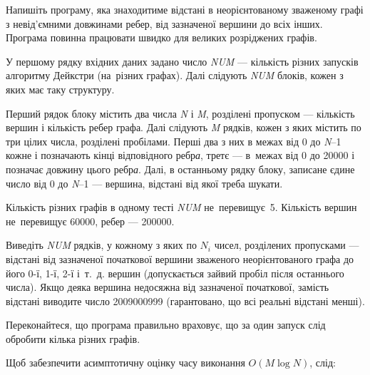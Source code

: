 ﻿Напишіть програму, яка знаходитиме відстані в неорієнтованому зваженому графі з невід'ємними довжинами ребер, від зазначеної вершини до всіх інших. Програма повинна працювати швидко для великих розріджених графів.

\InputFile
У першому рядку вхідних даних задано число {\it NUM} --- кількість різних запусків алгоритму Дейкстри (на~різних графах). Далі слідують {\it NUM} блоків, кожен з яких має таку структуру.

Перший рядок блоку містить два числа {\it N} і {\it M}, розділені пропуском --- кількість вершин і кількість ребер графа. Далі слідують {\it M} рядків, кожен з яких містить по три цілих числа, розділені пробілами. Перші два з них в межах від 0 до {\it N}–1 кожне і позначають кінці відповідного ребр{\it а}, третє --- в~межах від 0 до 20000 і позначає довжину цього ребр{\it а}. Далі, в останньому рядку блоку, записане єдине число від 0 до {\it N}–1 --- вершина, відстані від якої треба шукати.

Кількість різних графів в одному тесті {\it NUM} не~перевищує~5. Кількість вершин не~перевищує 60000, ребер --- 200000.

\OutputFile
Виведіть {\it NUM} рядків, у кожному з яких по $N_i$ чисел, розділених пропусками --- відстані від зазначеної початкової вершини зваженого неорієнтованого графа до його 0-ї, 1-ї, 2-ї і~т.~д. вершин (допускається зайвий пробіл після останнього числа). Якщо деяка вершина недосяжна від зазначеної початкової, замість відстані виводите число 2009000999 (гарантовано, що всі реальні відстані менші).

\Examples

\begin{example}
\end{example}


\Note

Переконайтеся, що програма правильно враховує, що за один запуск слід обробити кілька різних графів.

Щоб забезпечити асимптотичну оцінку часу виконання $O(M\log N)$, слід:

